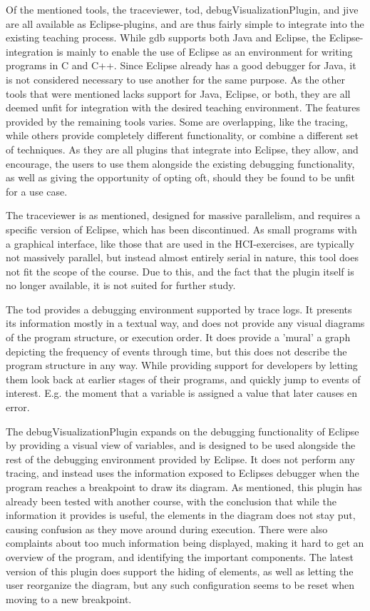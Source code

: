 Of the mentioned tools, the \gls{traceviewer}, \gls{tod}, \gls{debugVisualizationPlugin}, and \gls{jive} are all available as Eclipse-plugins, and are thus fairly simple to integrate into the existing teaching process.
While \gls{gdb} supports both Java and Eclipse, the Eclipse-integration is mainly to enable the use of Eclipse as an environment for writing programs in C and C++.
Since Eclipse already has a good debugger for Java, it is not considered necessary to use another for the same purpose.
As the other tools that were mentioned lacks support for Java, Eclipse, or both, they are all deemed unfit for integration with the desired teaching environment.
The features provided by the remaining tools varies.
Some are overlapping, like the tracing, while others provide completely different functionality, or combine a different set of techniques.
As they are all plugins that integrate into Eclipse, they allow, and encourage, the users to use them alongside the existing debugging functionality, as well as giving the opportunity of opting oft, should they be found to be unfit for a use case.

The \gls{traceviewer} is as mentioned, designed for massive parallelism, and requires a specific version of Eclipse, which has been discontinued.
As small programs with a graphical interface, like those that are used in the HCI-exercises, are typically not massively parallel, but instead almost entirely serial in nature, this tool does not fit the scope of the course.
Due to this, and the fact that the plugin itself is no longer available, it is not suited for further study.

The \gls{tod} provides a debugging environment supported by trace logs.
It presents its information mostly in a textual way, and does not provide any visual diagrams of the program structure, or execution order.
It does provide a 'mural' a graph depicting the frequency of events through time, but this does not describe the program structure in any way.
While providing support for developers by letting them look back at earlier stages of their programs, and quickly jump to events of interest.
E.g. the moment that a variable is assigned a value that later causes en error.

The \gls{debugVisualizationPlugin} expands on the debugging functionality of Eclipse by providing a visual view of variables, and is designed to be used alongside the rest of the debugging environment provided by Eclipse.
It does not perform any tracing, and instead uses the information exposed to Eclipses debugger when the program reaches a breakpoint to draw its diagram.
As mentioned, this plugin has already been tested with another course, with the conclusion that while the information it provides is useful, the elements in the diagram does not stay put, causing confusion as they move around during execution.
There were also complaints about too much information being displayed, making it hard to get an overview of the program, and identifying the important components.
The latest version of this plugin does support the hiding of elements, as well as letting the user reorganize the diagram, but any such configuration seems to be reset when moving to a new breakpoint.

